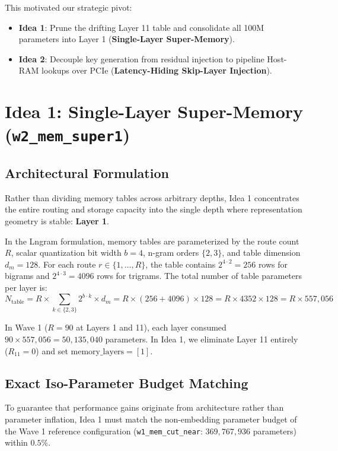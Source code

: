 \documentclass[11pt,a4paper]{article}
\begin{document}
This motivated our strategic pivot:
\begin{itemize}[leftmargin=1.4em, itemsep=2pt]
    \item \textbf{Idea 1}: Prune the drifting Layer 11 table and consolidate all 100M parameters into Layer 1 (\textbf{Single-Layer Super-Memory}).
    \item \textbf{Idea 2}: Decouple key generation from residual injection to pipeline Host-RAM lookups over PCIe (\textbf{Latency-Hiding Skip-Layer Injection}).
\end{itemize}

\vspace{0.5em}

\section{Idea 1: Single-Layer Super-Memory (\texttt{w2\_mem\_super1})}
\label{sec:idea1}

\subsection{Architectural Formulation}
Rather than dividing memory tables across arbitrary depths, Idea 1 concentrates the entire routing and storage capacity into the single depth where representation geometry is stable: \textbf{Layer 1}.

In the Lngram formulation, memory tables are parameterized by the route count $R$, scalar quantization bit width $b=4$, n-gram orders $\{2, 3\}$, and table dimension $d_m = 128$. For each route $r \in \{1, \dots, R\}$, the table contains $2^{4 \cdot 2} = 256$ rows for bigrams and $2^{4 \cdot 3} = 4096$ rows for trigrams. The total number of table parameters per layer is:
\begin{equation}
N_{\text{table}} = R \times \sum_{k \in \{2, 3\}} 2^{b \cdot k} \times d_m = R \times (256 + 4096) \times 128 = R \times 4352 \times 128 = R \times 557,056
\end{equation}

In Wave 1 ($R=90$ at Layers 1 and 11), each layer consumed $90 \times 557,056 = 50,135,040$ parameters. In Idea 1, we eliminate Layer 11 entirely ($R_{11} = 0$) and set $\text{memory\_layers} = [1]$.

\subsection{Exact Iso-Parameter Budget Matching}
To guarantee that performance gains originate from architecture rather than parameter inflation, Idea 1 must match the non-embedding parameter budget of the Wave 1 reference configuration (\texttt{w1\_mem\_cut\_near}: $369,767,936$ parameters) within $0.5\%$.
\end{document}
